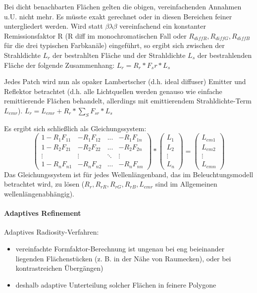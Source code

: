 \documentclass[10pt,landscape]{article}
\begin{document}
\begin{multicols}{3}
Bei dicht benachbarten Flächen gelten die obigen, vereinfachenden Annahmen u.U. nicht mehr. Es müsste exakt gerechnet oder in diesen Bereichen feiner untergliedert werden. 
Wird statt $\beta \lambda \beta$ vereinfachend ein konstanter Remissionsfaktor R (R diff im monochromatischen Fall oder $R_{diff R}, R_{diffG}, R_{diffB}$ für die drei typischen Farbkanäle) eingeführt, so ergibt sich zwischen der Strahldichte $L_r$ der bestrahlten Fläche und der Strahldichte $L_s$ der bestrahlenden Fläche der folgende Zusammenhang: $L_r=R_r*F_sr*L_s$

Jedes Patch wird nun als opaker Lambertscher (d.h. ideal diffuser) Emitter und Reflektor betrachtet (d.h. alle Lichtquellen werden genauso wie einfache remittierende Flächen behandelt, allerdings mit emittierendem Strahldichte-Term $L_{emr}$). $L_r=L_{emr}+R_r*\sum_S F_{sr}*L_s$

Es ergibt sich schließlich als Gleichungssystem:
$$ \begin{pmatrix} 1-R_1F_{11} & -R_1F_{12} &...& -R_1F_{1n}\\ 1-R_2F_{21} & -R_2F_{22} &...& -R_2F_{2n}\\ \vdots & \vdots & \ddots & \vdots \\ 1-R_nF_{n1} & -R_nF_{n2} &...& -R_nF_{nn} \end{pmatrix} * \begin{pmatrix} L_1\\L_2\\\vdots\\L_n \end{pmatrix} = \begin{pmatrix} L_{em1}\\L_{em2}\\\vdots\\L_{emn} \end{pmatrix}$$
Das Gleichungssystem ist für jedes Wellenlängenband, das im Beleuchtungsmodell betrachtet wird, zu lösen ($R_r, R_{rR}, R_{rG}, R_{rB}, L_{emr}$ sind im Allgemeinen wellenlängenabhängig).

\paragraph{Adaptives Refinement}
Adaptives Radiosity-Verfahren:
\begin{itemize}
  \item vereinfachte Formfaktor-Berechnung ist ungenau bei eng beieinander liegenden Flächenstücken (z. B. in der Nähe von Raumecken), oder bei kontrastreichen Übergängen)
  \item deshalb adaptive Unterteilung solcher Flächen in feinere Polygone
\end{itemize}


\end{multicols}
\end{document}
